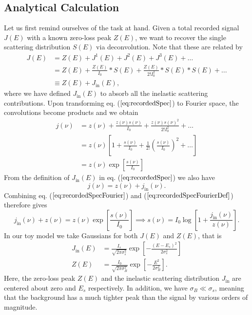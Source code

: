 \subsection{Analytical Calculation}
Let us first remind ourselves of the task at hand. Given a total recorded signal $J(E)$ with a known zero-loss peak $Z(E)$, we want to recover the single scattering distribution $S(E)$ via deconvolution. Note that these are related by
\begin{align}
\nonumber J(E) &= Z(E) + J^1(E) + J^2(E) + J^3(E) + \dots\\
\nonumber&= Z(E) + \frac{Z(E)}{I_0}*S(E) + \frac{Z(E)}{2!I_0^2}*S(E)*S(E) + \dots\\
&\equiv Z(E) + J_{\mathrm{in}}(E),
\label{eq:recordedSpec}
\end{align}
where we have defined $J_{\mathrm{in}}(E)$ to absorb all the inelastic scattering contributions. Upon transforming eq. ($\ref{eq:recordedSpec}$) to Fourier space, the convolutions become products and we obtain
\begin{align}
\nonumber j(\nu) &= z(\nu) + \frac{z(\nu)s(\nu)}{I_0} + \frac{z(\nu)s(\nu)^2}{2!I_0^2}+\dots\\
\nonumber&= z(\nu)\left[1+\frac{s(\nu)}{I_0}+\frac{1}{2!}\left(\frac{s(\nu)}{I_0}\right)^2+\dots\right]\\
&=z(\nu)\exp\left[\frac{s(\nu)}{I_0}\right]
\label{eq:recordedSpecFourier}
\end{align}
From the definition of $J_{\mathrm{in}}(E)$ in eq. ($\ref{eq:recordedSpec}$) we also have
\begin{equation}
j(\nu) = z(\nu) + j_{\mathrm{in}}(\nu).
\label{eq:recordedSpecFourierDef}
\end{equation}
Combining eq. ($\ref{eq:recordedSpecFourier}$) and ($\ref{eq:recordedSpecFourierDef}$) therefore gives
\begin{equation}
j_{\mathrm{in}}(\nu) + z(\nu) = z(\nu)\exp\left[\frac{s(\nu)}{I_0}\right] \implies s(\nu) = I_0\log\left[1+ \frac{j_{\mathrm{in}}(\nu)}{z(\nu)}\right].
\label{eq:snu}
\end{equation}
In our toy model we take Gaussians for both $J(E)$ and $Z(E)$, that is
\begin{align}
\label{eq:Jin}
J_{\mathrm{in}}(E) &= \frac{I_s}{\sqrt{2\pi\sigma_s^2}}\exp\left[-\frac{(E-E_s)^2}{2\sigma_s^2}\right]\\
Z(E) &= \frac{I_0}{\sqrt{2\pi\sigma_B^2}}\exp\left[-\frac{E^2}{2\sigma_B^2}\right].
\label{eq:ZLP}
\end{align}
Here, the zero-loss peak $Z(E)$ and the inelastic scattering distribution $J_{\mathrm{in}}$ are centered about zero and $E_s$ respectively. In addition, we have $\sigma_B \ll \sigma_s$, meaning that the background has a much tighter peak than the signal by various orders of magnitude. 

